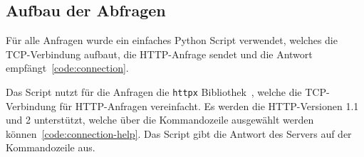 \FloatBarrier{}
\subsection{Aufbau der Abfragen}

Für alle Anfragen wurde ein einfaches Python Script verwendet, welches die TCP-Verbindung aufbaut, die HTTP-Anfrage sendet und die Antwort empfängt~\ref{code:connection}.


Das Script nutzt für die Anfragen die \texttt{httpx} Bibliothek~\cite{httpx_http2}, welche die TCP-Verbindung für HTTP-Anfragen vereinfacht.
Es werden die HTTP-Versionen 1.1 und 2 unterstützt, welche über die Kommandozeile ausgewählt werden können~\ref{code:connection-help}.
Das Script gibt die Antwort des Servers auf der Kommandozeile aus.

